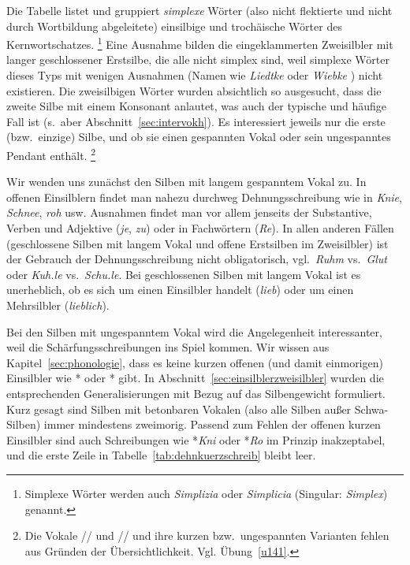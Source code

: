 Die Tabelle listet und gruppiert \textit{simplexe} Wörter (also nicht flektierte und nicht durch Wortbildung abgeleitete) einsilbige und trochäische Wörter des Kernwortschatzes.%
\footnote{Simplexe Wörter werden auch \textit{Simplizia} oder \textit{Simplicia} (Singular: \textit{Simplex}) genannt.}
Eine Ausnahme bilden die eingeklammerten Zweisilbler mit langer geschlossener Erstsilbe, die alle nicht simplex sind, weil simplexe Wörter dieses Typs mit wenigen Ausnahmen (\zB Namen wie \textit{Liedtke} \textipa{[li:tk@]} oder \textit{Wiebke} \textipa{[vi:pk@]}) nicht existieren.\label{abs:wiebke}
Die zweisilbigen Wörter wurden absichtlich so ausgesucht, dass die zweite Silbe mit einem Konsonant anlautet, was auch der typische und häufige Fall ist (s.\ aber Abschnitt~\ref{sec:intervokh}).
Es interessiert jeweils nur die erste (bzw.\ einzige) Silbe, und ob sie einen gespannten Vokal oder sein ungespanntes Pendant enthält.%
\footnote{Die Vokale /\textipa{\o}/ und // und ihre kurzen bzw.\ ungespannten Varianten fehlen aus Gründen der Übersichtlichkeit.
Vgl. Übung~\ref{u141}.}

Wir wenden uns zunächst den Silben mit langem gespanntem Vokal zu.
In offenen Einsilblern findet man nahezu durchweg Dehnungsschreibung wie in \textit{Knie}, \textit{Schnee}, \textit{roh} usw.
Ausnahmen findet man vor allem jenseits der Substantive, Verben und Adjektive (\zB \textit{je}, \textit{zu}) oder in Fachwörtern (\zB \textit{Re}).
In allen anderen Fällen (geschlossene Silben mit langem Vokal und offene Erstsilben im Zweisilbler) ist der Gebrauch der Dehnungsschreibung nicht obligatorisch, vgl.\ \textit{Ruhm} vs.\ \textit{Glut} oder \textit{Kuh.le} vs.\ \textit{Schu.le}.
Bei geschlossenen Silben mit langem Vokal ist es unerheblich, ob es sich um einen Einsilbler handelt (\textit{lieb}) oder um einen Mehrsilbler (\textit{lieblich}).

Bei den Silben mit ungespanntem Vokal wird die Angelegenheit interessanter, weil die Schärfungsschreibungen ins Spiel kommen.
Wir wissen aus Kapitel~\ref{sec:phonologie}, dass es keine kurzen offenen (und damit einmorigen) Einsilbler wie *\textipa{[knI]} oder *\textipa{[KO]} gibt.
In Abschnitt~\ref{sec:einsilblerzweisilbler} wurden die entsprechenden Generalisierungen mit Bezug auf das Silbengewicht formuliert.
Kurz gesagt sind Silben mit betonbaren Vokalen (also alle Silben außer Schwa-Silben) immer mindestens zweimorig.
Passend zum Fehlen der offenen kurzen Einsilbler sind auch Schreibungen wie *\textit{Kni} oder *\textit{Ro} im Prinzip inakzeptabel, und die erste Zeile in Tabelle~\ref{tab:dehnkuerzschreib} bleibt leer.


